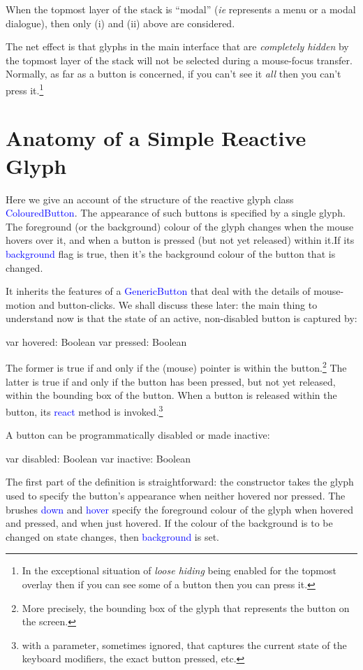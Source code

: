 \documentclass[12pt,a4paper]{article}
\def\Scala#1{\textcolor{blue}{\textsf{#1}}}
\def\S#1{\section{#1}}
\begin{document}
When the topmost layer of the stack is ``modal'' (\textit{ie} represents a menu
or a modal dialogue), then only (i) and (ii) above are considered.

The net effect is that glyphs in the main interface
that are \textit{completely hidden} by the topmost layer of the stack will not
be selected during a mouse-focus transfer. Normally, as far as a button
is concerned, if you can't see it \textit{all} then you can't press
it.\footnote{In the exceptional situation of \textit{loose hiding} being
enabled for the topmost overlay then if you can see some of a button then you can press it.}

\clearpage
\S{Anatomy of a Simple Reactive Glyph}

Here we give an account of the structure of the reactive glyph class
\Scala{ColouredButton}. The appearance of such buttons is specified
by a single glyph. The  foreground (or the background) colour of the glyph
changes when the mouse hovers over it, and when a button is
pressed (but not yet released) within it.If its \Scala{background}
flag is true, then it's the background colour of the button that is changed.

It inherits the features of a \Scala{GenericButton} that deal with
the details of mouse-motion and button-clicks. We shall discuss
these later: the main thing to understand now is that the state of
an active, non-disabled button is captured by:

\begin{scala}
    var hovered:  Boolean
    var pressed:  Boolean
\end{scala}

The former is true if and only if the (mouse) pointer is within the
button.\footnote{More precisely, the bounding
box of the glyph that represents the button on the screen.} The
latter is true if and only if the button has been pressed, but not
yet released, within the bounding box of the button. When a button is
released within the button, its \Scala{react} method is
invoked.\footnote{with a parameter, sometimes ignored, that captures the
current state of the keyboard modifiers, the exact button pressed, etc.}

A button can be programmatically disabled or made inactive:
\begin{scala}
    var disabled: Boolean
    var inactive: Boolean
\end{scala}

The first part of the definition is straightforward: the constructor
takes the glyph used to specify the button's appearance when neither
hovered nor pressed. The brushes \Scala{down} and \Scala{hover} specify
the foreground colour of the glyph when hovered and pressed, and when
just hovered. If the colour of the background is to be changed on
state changes, then \Scala{background} is set.
\end{document}
